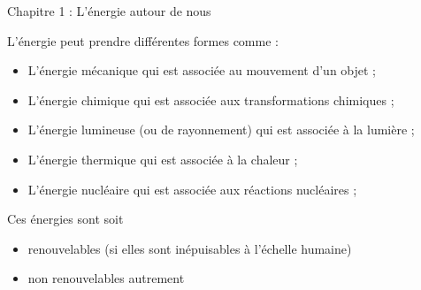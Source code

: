 \documentclass[24pt]{article}
\newcommand{\titre}{Chapitre 1 : L'énergie autour de nous} %
\begin{document}
\thispagestyle{fancy}
\cfoot{}

\begin{titlebox}{\titre}
    \setlength\parindent{4pt} %
    \setlength\parskip{5pt} 

    L’énergie peut prendre différentes formes comme :
    \begin{itemize}
        \item L’énergie mécanique qui est associée au mouvement d’un objet ;
        \item L’énergie chimique qui est associée aux transformations chimiques ;
        \item L’énergie lumineuse (ou de rayonnement) qui est associée à la lumière ;
        \item L’énergie thermique qui est associée à la chaleur ;
        \item L’énergie nucléaire qui est associée aux réactions nucléaires ;
    \end{itemize}

    Ces énergies sont soit \begin{itemize}
        \item renouvelables (si elles sont inépuisables à l'échelle humaine)
        \item non renouvelables autrement
    \end{itemize}

    
    \vspace{50pt}

\end{titlebox}
\end{document}
